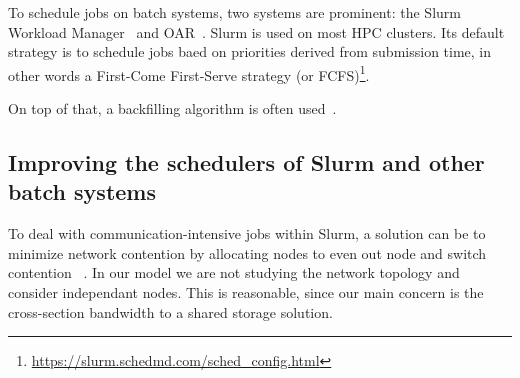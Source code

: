 \documentclass[conference,10pt]{IEEEtran}
\begin{document}
To schedule jobs on batch systems, two systems are prominent: the Slurm Workload Manager~\cite{SLURM} and OAR~\cite{oar}.
Slurm is used on most HPC clusters. Its default strategy is to schedule jobs baed on priorities derived
from submission time, in other words a First-Come First-Serve strategy
(or FCFS)\footnote{{\scriptsize\url{https://slurm.schedmd.com/sched_config.html}}}.

On top of that, a backfilling algorithm is often used~\cite{New_Backfill}.

\subsection{Improving the schedulers of Slurm and other batch systems}

To deal with communication-intensive jobs within Slurm, a solution can be to
minimize network contention by allocating nodes to even out node and switch contention
~\cite{minimize_network_contention}. 
In our model we are not studying the network topology and consider independant nodes.
This is reasonable, since our main concern is the cross-section bandwidth to a shared storage solution.
\end{document}
